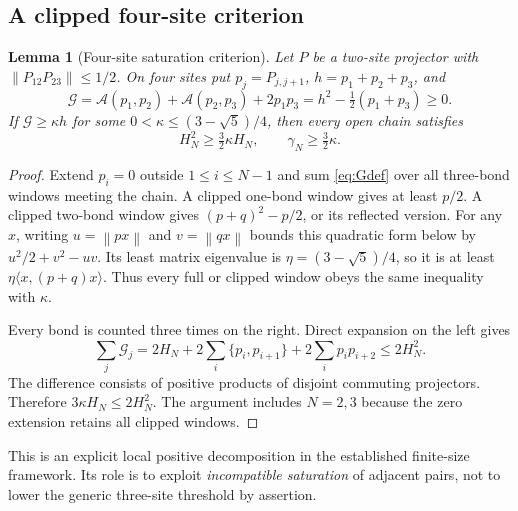 \documentclass[11pt,a4paper]{article}
\newtheorem{lemma}[theorem]{Lemma}
\theoremstyle{remark}\newtheorem{remark}[theorem]{Remark}
\newcommand{\norm}[1]{\left\lVert #1\right\rVert}
\begin{document}
\subsection{A clipped four-site criterion}
\begin{lemma}[Four-site saturation criterion]\label{lem:saturation}
Let $P$ be a two-site projector with $\norm{P_{12}P_{23}}\le1/2$. On four sites put $p_j=P_{j,j+1}$, $h=p_1+p_2+p_3$, and
\begin{equation}\label{eq:Gdef}
 \mathcal G=\mathcal A(p_1,p_2)+\mathcal A(p_2,p_3)+2p_1p_3
 =h^2-\tfrac12(p_1+p_3)\ge0.
\end{equation}
If $\mathcal G\ge\kappa h$ for some $0<\kappa\le(3-\sqrt5)/4$, then every open chain satisfies
\begin{equation}\label{eq:saturationbound}
 H_N^2\ge\tfrac32\kappa H_N,\qquad \gamma_N\ge\tfrac32\kappa.
\end{equation}
\end{lemma}
\begin{proof}
Extend $p_i=0$ outside $1\le i\le N-1$ and sum \eqref{eq:Gdef} over all three-bond windows meeting the chain. A clipped one-bond window gives at least $p/2$. A clipped two-bond window gives $(p+q)^2-p/2$, or its reflected version. For any $x$, writing $u=\norm{px}$ and $v=\norm{qx}$ bounds this quadratic form below by $u^2/2+v^2-uv$. Its least matrix eigenvalue is $\eta=(3-\sqrt5)/4$, so it is at least $\eta\langle x,(p+q)x\rangle$. Thus every full or clipped window obeys the same inequality with $\kappa$.

Every bond is counted three times on the right. Direct expansion on the left gives
\[
 \sum_j\mathcal G_j
 =2H_N+2\sum_i\{p_i,p_{i+1}\}+2\sum_i p_i p_{i+2}
 \le2H_N^2.
\]
The difference consists of positive products of disjoint commuting projectors. Therefore $3\kappa H_N\le2H_N^2$. The argument includes $N=2,3$ because the zero extension retains all clipped windows.
\end{proof}
This is an explicit local positive decomposition in the established finite-size framework. Its role is to exploit \emph{incompatible saturation} of adjacent pairs, not to lower the generic three-site threshold by assertion.
\end{document}
